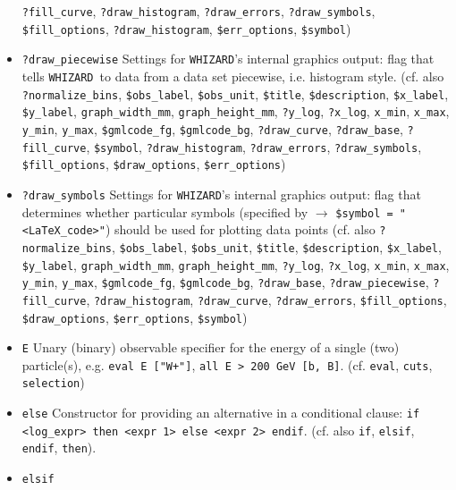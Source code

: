 \documentclass[12pt]{book}
\newcommand{\ttt}[1]{\texttt{#1}}
\newcommand{\whizard}{\texttt{WHIZARD}}
\begin{document}
\begin{itemize}
\ttt{?fill\_curve}, \ttt{?draw\_histogram}, \ttt{?draw\_errors},
\ttt{?draw\_symbols}, \newline \ttt{\$fill\_options}, \ttt{?draw\_histogram},
\ttt{\$err\_options}, \ttt{\$symbol})
\item
\ttt{?draw\_piecewise} \newline
Settings for \whizard's internal graphics output: flag that tells
\whizard\ to data from a data set piecewise, i.e. histogram
style. (cf. also \ttt{?normalize\_bins}, \ttt{\$obs\_label},
\ttt{\$obs\_unit},  \ttt{\$title}, \ttt{\$description},
\ttt{\$x\_label}, \ttt{\$y\_label}, \ttt{graph\_width\_mm},
\ttt{graph\_height\_mm}, \ttt{?y\_log}, \ttt{?x\_log}, \ttt{x\_min},
\ttt{x\_max},  \ttt{y\_min}, \ttt{y\_max}, \ttt{\$gmlcode\_fg},
\ttt{\$gmlcode\_bg},  \ttt{?draw\_curve}, \ttt{?draw\_base},
\ttt{?fill\_curve}, \ttt{\$symbol}, \ttt{?draw\_histogram},
\ttt{?draw\_errors}, \ttt{?draw\_symbols}, \ttt{\$fill\_options},
\ttt{\$draw\_options}, \ttt{\$err\_options})
\item
\ttt{?draw\_symbols} \newline
Settings for \whizard's internal graphics output: flag that determines
whether particular symbols (specified by $\to$ \ttt{\$symbol =
"<LaTeX\_code>"}) should be used for plotting data points  (cf. also
\ttt{?normalize\_bins}, \ttt{\$obs\_label}, \ttt{\$obs\_unit}, 
\ttt{\$title}, \ttt{\$description}, \ttt{\$x\_label},
\ttt{\$y\_label}, \ttt{graph\_width\_mm}, \ttt{graph\_height\_mm},
\ttt{?y\_log}, \ttt{?x\_log}, \ttt{x\_min}, \ttt{x\_max}, 
\ttt{y\_min}, \ttt{y\_max}, \ttt{\$gmlcode\_fg}, \ttt{\$gmlcode\_bg},
\ttt{?draw\_base}, \ttt{?draw\_piecewise},
\ttt{?fill\_curve}, \ttt{?draw\_histogram}, \ttt{?draw\_curve},
\ttt{?draw\_errors}, \ttt{\$fill\_options},
\ttt{\$draw\_options}, \newline \ttt{\$err\_options}, \ttt{\$symbol})
\item
\ttt{E} \newline
Unary (binary) observable specifier for the energy of a single
(two) particle(s), e.g. \ttt{eval E ["W+"]}, \ttt{all E > 200 GeV [b,
  B]}. (cf. \ttt{eval}, \ttt{cuts}, \ttt{selection}) 
\item
\ttt{else} \label{sindarin_else}\newline 
Constructor for providing an alternative in a conditional clause: 
\ttt{if <log\_expr> then <expr 1> else <expr 2> endif}. (cf. also
\ttt{if}, \ttt{elsif}, \ttt{endif}, \ttt{then}).
\item
\ttt{elsif} \newline 

\end{itemize}
\end{document}

